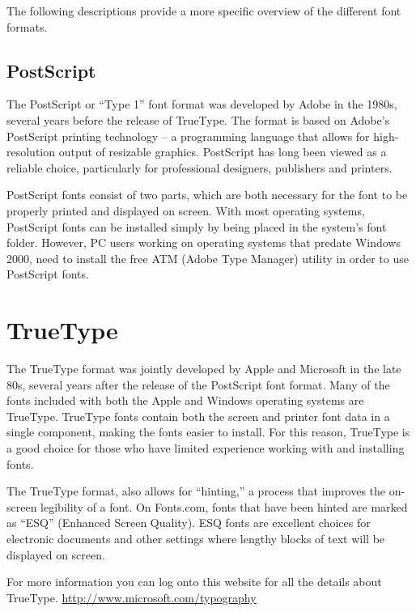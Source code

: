 \begin{multicols}{2}
The following descriptions provide a more specific overview of the different font formats.


\subsection{PostScript}

The PostScript or “Type 1” font format was developed by Adobe in the 1980s, several years before the release of TrueType. The format is based on Adobe’s PostScript printing technology – a programming language that allows for high-resolution output of resizable graphics. PostScript has long been viewed as a reliable choice, particularly for professional designers, publishers and printers.

PostScript fonts consist of two parts, which are both necessary for the font to be properly printed and displayed on screen. With most operating systems, PostScript fonts can be installed simply by being placed in the system’s font folder. However, PC users working on operating systems that predate Windows 2000, need to install the free ATM (Adobe Type Manager) utility in order to use PostScript fonts.



\section{TrueType}
The TrueType format was jointly developed by Apple and Microsoft in the late 80s, several years after the release of the PostScript font format. Many of the fonts included with both the Apple and Windows operating systems are TrueType. TrueType fonts contain both the screen and printer font data in a single component, making the fonts easier to install. For this reason, TrueType is a good choice for those who have limited experience working with and installing fonts.

The TrueType format, also allows for “hinting,” a process that improves the on-screen legibility of a font. On Fonts.com, fonts that have been hinted are marked as “ESQ” (Enhanced Screen Quality). ESQ fonts are excellent choices for electronic documents and other settings where lengthy blocks of text will be displayed on screen.

For more information you can log onto this website for all the details about TrueType. \url{http://www.microsoft.com/typography}



\end{multicols}
